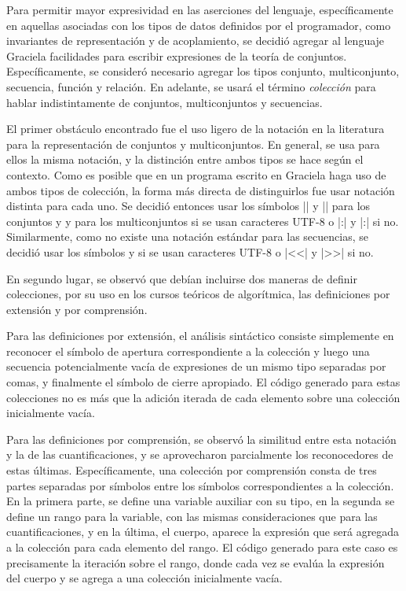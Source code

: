 {{Para permitir mayor expresividad en las aserciones del lenguaje, específicamente
en aquellas asociadas con los tipos de datos definidos por el programador, como
invariantes de representación y de acoplamiento, se decidió agregar al lenguaje
Graciela facilidades para escribir expresiones de la teoría de conjuntos.
Específicamente, se consideró necesario agregar los tipos conjunto,
multiconjunto, secuencia, función y relación. En adelante, se usará el término
\textit{colección} para hablar indistintamente de conjuntos, multiconjuntos y
secuencias.

El primer obstáculo encontrado fue el uso ligero de la notación en la literatura
para la representación de conjuntos y multiconjuntos. En general, se usa para
ellos la misma notación, y la distinción entre ambos tipos se hace según el
contexto. Como es posible que en un programa escrito en Graciela haga uso de
ambos tipos de colección, la forma más directa de distinguirlos fue usar
notación distinta para cada uno. Se decidió entonces usar los símbolos \ingra|{|
y \ingra|}| para los conjuntos y \Lbag{} y \Rbag{} para los multiconjuntos si se
usan caracteres UTF-8  o \ingra|{:| y \ingra|:}| si no. Similarmente, como no
existe una notación estándar para las secuencias, se decidió usar los símbolos
\Lseq{} y \Rseq{} si se usan caracteres UTF-8 o \ingra|<<| y \ingra|>>| si no.

En segundo lugar, se observó que debían incluirse dos maneras de definir
colecciones, por su uso en los cursos teóricos de algorítmica, las definiciones
por extensión y por comprensión.

Para las definiciones por extensión, el análisis sintáctico consiste simplemente
en reconocer el símbolo de apertura correspondiente a la colección y luego una
secuencia potencialmente vacía de expresiones de un mismo tipo separadas por
comas, y finalmente el símbolo de cierre apropiado. El código generado para
estas colecciones no es más que la adición iterada de cada elemento sobre una
colección inicialmente vacía.

Para las definiciones por comprensión, se observó la similitud entre esta
notación y la de las cuantificaciones, y se aprovecharon parcialmente los
reconocedores de estas últimas. Específicamente, una colección por comprensión
consta de tres partes separadas por símbolos \ingra{|} entre los símbolos
correspondientes a la colección. En la primera parte, se define una variable
auxiliar con su tipo, en la segunda se define un rango para la variable, con las
mismas consideraciones que para las cuantificaciones, y en la última, el cuerpo,
aparece la expresión que será agregada a la colección para cada elemento del
rango. El código generado para este caso es precisamente la iteración sobre el
rango, donde cada vez se evalúa la expresión del cuerpo y se agrega a una
colección inicialmente vacía.

}}
